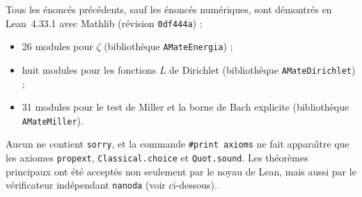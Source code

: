 \documentclass[11pt,a4paper]{amsart}
\theoremstyle{definition}
\theoremstyle{remark}
\begin{document}
Tous les \'enonc\'es pr\'ec\'edents, sauf les \'enonc\'es num\'eriques, sont d\'emontr\'es en Lean~4.33.1 avec Mathlib (r\'evision \texttt{0df444a}) :
\begin{itemize}
\item 26 modules pour $\zeta$ (biblioth\`eque \texttt{AMateEnergia}) ;
\item huit modules pour les fonctions $L$ de Dirichlet (biblioth\`eque \texttt{AMateDirichlet}) ;
\item 31 modules pour le test de Miller et la borne de Bach explicite (biblioth\`eque \texttt{AMateMiller}).
\end{itemize}
Aucun ne contient \texttt{sorry}, et la commande \texttt{\#print axioms} ne fait appara\^{\i}tre que les axiomes \texttt{propext}, \texttt{Classical.choice} et \texttt{Quot.sound}. Les th\'eor\`emes principaux ont \'et\'e accept\'es non seulement par le noyau de Lean, mais aussi par le v\'erificateur ind\'ependant \texttt{nanoda} (voir ci-dessous).
\end{document}
